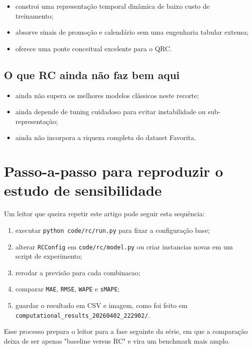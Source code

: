\documentclass[12pt]{article}
\providecommand{\tightlist}{%
              \setlength{\itemsep}{0pt}\setlength{\parskip}{0pt}}
\begin{document}
\begin{itemize}
\tightlist
\item
  constroi uma representação temporal dinâmica de baixo custo de treinamento;
\item
  absorve sinais de promoção e calendário sem uma engenharia tabular extensa;
\item
  oferece uma ponte conceitual excelente para o QRC.
\end{itemize}

\subsection{O que RC ainda não faz bem aqui}\label{82-o-que-rc-ainda-nuxe3o-faz-bem-aqui}

\begin{itemize}
\tightlist
\item
  ainda não supera os melhores modelos clássicos neste recorte;
\item
  ainda depende de tuning cuidadoso para evitar instabilidade ou sub-representação;
\item
  ainda não incorpora a riqueza completa do dataset Favorita.
\end{itemize}

\section{Passo-a-passo para reproduzir o estudo de sensibilidade}\label{9-passo-a-passo-para-reproduzir-o-estudo-de-sensibilidade}

Um leitor que queira repetir este artigo pode seguir esta sequência:

\begin{enumerate}
\def\labelenumi{\arabic{enumi}.}
\tightlist
\item
  executar \texttt{python\ code/rc/run.py} para fixar a configuração base;
\item
  alterar \texttt{RCConfig} em \texttt{code/rc/model.py} ou criar instancias novas em um script de experimento;
\item
  rerodar a previsão para cada combinacao;
\item
  comparar \texttt{MAE}, \texttt{RMSE}, \texttt{WAPE} e \texttt{sMAPE};
\item
  guardar o resultado em CSV e imagem, como foi feito em \texttt{computational\_results\_20260402\_222902/}.
\end{enumerate}

Esse processo prepara o leitor para a fase seguinte da série, em que a comparação deixa de ser apenas "baseline versus RC" e vira um benchmark mais amplo.
\end{document}
